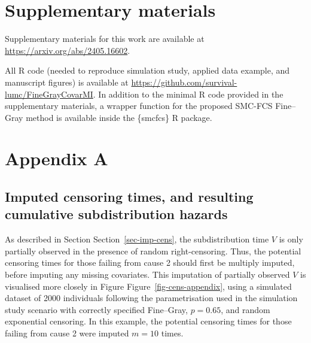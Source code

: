 \documentclass[
  letterpaper,
  DIV=11,
  numbers=noendperiod]{scrreprt}
\begin{document}
\section*{Supplementary materials}\label{supplementary-materials-3}


Supplementary materials for this work are available at
\url{https://arxiv.org/abs/2405.16602}.

All R code (needed to reproduce simulation study, applied data example,
and manuscript figures) is available at
\url{https://github.com/survival-lumc/FineGrayCovarMI}. In addition to
the minimal R code provided in the supplementary materials, a wrapper
function for the proposed SMC-FCS Fine--Gray method is available inside
the \{smcfcs\} R package.

\section*{Appendix A}\label{appendix-a-1}


\subsection*{Imputed censoring times, and resulting cumulative
subdistribution
hazards}\label{imputed-censoring-times-and-resulting-cumulative-subdistribution-hazards}

As described in Section Section~\ref{sec-imp-cens}, the subdistribution
time \(V\) is only partially observed in the presence of random
right-censoring. Thus, the potential censoring times for those failing
from cause 2 should first be multiply imputed, before imputing any
missing covariates. This imputation of partially observed \(V\) is
visualised more closely in Figure Figure~\ref{fig-cens-appendix}, using
a simulated dataset of 2000 individuals following the parametrisation
used in the simulation study scenario with correctly specified
Fine--Gray, \(p = 0.65\), and random exponential censoring. In this
example, the potential censoring times for those failing from cause 2
were imputed \(m = 10\) times.
\end{document}
